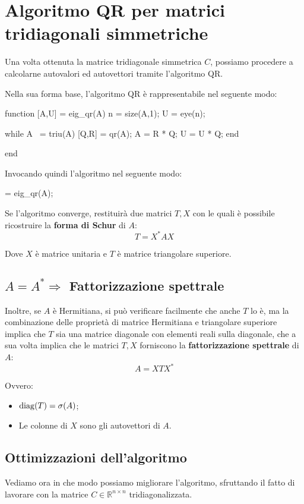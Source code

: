 \section{Algoritmo QR per matrici tridiagonali simmetriche}
Una volta ottenuta la matrice tridiagonale simmetrica $C$, possiamo procedere a 
calcolarne autovalori ed autovettori tramite l'algoritmo QR.

Nella sua forma base, l'algoritmo QR è rappresentabile nel seguente modo:

\begin{programma}
function [A,U] = eig_qr(A)
n = size(A,1);
U = eye(n);

while A ~= triu(A)
	[Q,R] = qr(A);
	A = R * Q;
	U = U * Q;
end

end
\end{programma}

Invocando quindi l'algoritmo nel seguente modo:
\begin{programma}
	[T,X] = eig_qr(A);
\end{programma}
Se l'algoritmo converge, restituirà due matrici $T,X$ con le quali è possibile 
ricostruire la \textbf{forma di Schur} di $A$:
\begin{equation*}
	T = X^* A X
\end{equation*}

Dove $X$ è matrice unitaria e $T$ è matrice triangolare superiore. 
\subsection{$A = A^* \Rightarrow $ Fattorizzazione spettrale}
Inoltre, se $A$ è Hermitiana, si può verificare facilmente che anche $T$ lo è, 
ma la combinazione delle proprietà di matrice Hermitiana e triangolare superiore 
implica che $T$ sia una matrice diagonale con elementi reali sulla diagonale, 
che a sua volta implica che le matrici $T,X$ forniscono la 
\textbf{fattorizzazione spettrale} di $A$:
\begin{equation*}
	A = X T X^*
\end{equation*}

Ovvero:
\begin{itemize}
	\item $\operatorname{diag}(T) = \sigma(A)$;
	\item Le colonne di $X$ sono gli autovettori di $A$.
\end{itemize}

\newpage
\subsection{Ottimizzazioni dell'algoritmo}
Vediamo ora in che modo possiamo migliorare l'algoritmo, sfruttando il fatto di 
lavorare con la matrice $C\in \mathbb{R}^{n \times n}$ tridiagonalizzata.

